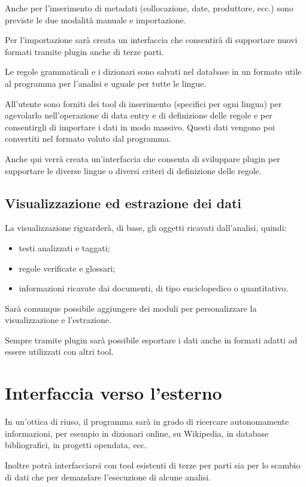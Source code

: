 \documentclass[twoside,stylearticle,12pt,filologia,it,article,xelatex,bibsection]{spinoza}
\begin{document}
Anche per l'inserimento di metadati (collocazione, date, produttore,
ecc.) sono previste le due modalità manuale e importazione. 

Per l'importazione sarà creata un interfaccia che consentirà di
supportare nuovi formati tramite plugin anche di terze parti.

Le regole grammaticali e i dizionari sono salvati nel database in un
formato utile al programma per l'analisi e uguale per tutte le lingue.

All'utente sono forniti dei tool di inserimento (specifici per ogni
lingua) per agevolarlo nell'operazione di data entry e di definizione
delle regole e per consentirgli di importare i dati in modo
massivo. Questi dati vengono poi convertiti nel formato voluto dal
programma.

Anche qui verrà creata un'interfaccia che consenta di sviluppare
plugin per supportare le diverse lingue o diversi criteri di
definizione delle regole.

\subsection{Visualizzazione ed estrazione dei dati}

La visualizzazione riguarderà, di base, gli oggetti ricavati
dall'analisi, quindi:

\begin{itemize}
\item testi analizzati e taggati;
\item regole verificate e glossari;
\item informazioni ricavate dai documenti, di tipo enciclopedico o
  quantitativo.
\end{itemize}

Sarà comunque possibile aggiungere dei moduli per personalizzare la
visualizzazione e l'estrazione.

Sempre tramite plugin sarà possibile esportare i dati anche in formati
adatti ad essere utilizzati con altri tool.

\section{Interfaccia verso l'esterno}

In un'ottica di riuso, il programma sarà in grado di ricercare
autonomamente informazioni, per esempio in dizionari online, su
Wikipedia, in database bibliografici, in progetti opendata, ecc.

Inoltre potrà interfacciarsi con tool esistenti di terze per parti sia
per lo scambio di dati che per demandare l'esecuzione di alcune
analisi.
\end{document}
